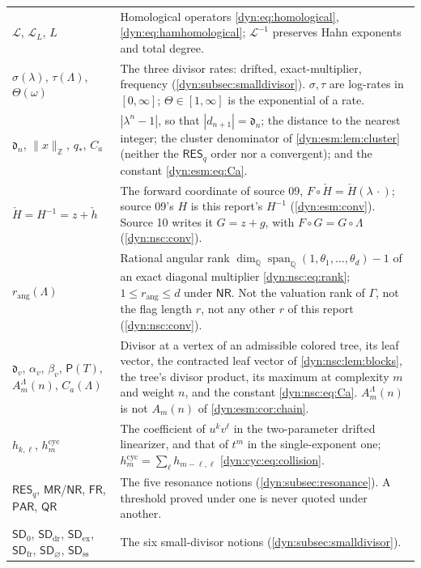 \documentclass[11pt,letterpaper]{article}
\theoremstyle{definition}
\theoremstyle{remark}
\newcommand{\Q}{\mathbb Q}
\newcommand{\Z}{\mathbb Z}
\newcommand{\Li}{\mathcal L}
\newcommand{\sdz}{\mathsf{SD}_{0}}
\newcommand{\sddr}{\mathsf{SD}_{\mathrm{dr}}}
\newcommand{\sdex}{\mathsf{SD}_{\mathrm{ex}}}
\newcommand{\sdfr}{\mathsf{SD}_{\mathrm{fr}}}
\newcommand{\sdno}{\mathsf{SD}_{\varnothing}}
\newcommand{\resq}{\mathsf{RES}_q}
\newcommand{\mres}{\mathsf{MR}}
\newcommand{\nres}{\mathsf{NR}}
\newcommand{\fres}{\mathsf{FR}}
\newcommand{\pares}{\mathsf{PAR}}
\newcommand{\qres}{\mathsf{QR}}
\newcommand{\sdss}{\mathsf{SD}_{\mathrm{ss}}}
\newcommand{\rang}{r_{\mathrm{ang}}}
\numberwithin{equation}{section}
\begin{document}
\begin{longtable}{@{}P{0.22\textwidth}P{0.71\textwidth}@{}}
$\Li$, $\Li_L$, $L$ & Homological operators
\eqref{dyn:eq:homological}, \eqref{dyn:eq:hamhomological}; $\Li^{-1}$
preserves Hahn exponents and total degree.\\[3pt]
$\sigma(\lambda)$, $\tau(\Lambda)$, $\Theta(\omega)$ & The three divisor
rates: drifted, exact-multiplier, frequency
(\cref{dyn:subsec:smalldivisor}). $\sigma,\tau$ are log-rates in
$[0,\infty]$; $\Theta\in[1,\infty]$ is the exponential of a rate.\\[3pt]
$\mathfrak d_n$, $\|x\|_{\Z}$, $q_*$, $C_a$ & $|\lambda^{n}-1|$, so that
$|d_{n+1}|=\mathfrak d_n$; the distance to the nearest integer; the cluster
denominator of \cref{dyn:esm:lem:cluster} (neither the $\resq$ order nor a
convergent); and the constant \eqref{dyn:esm:eq:Ca}.\\[3pt]
$\check H=H^{-1}=z+\check h$ & The forward coordinate of source 09,
$F\circ\check H=\check H(\lambda\,\cdot)$; source 09's $H$ is this report's
$H^{-1}$ (\cref{dyn:esm:conv}). Source 10 writes it $G=z+g$, with
$F\circ G=G\circ\Lambda$ (\cref{dyn:nsc:conv}).\\[3pt]
$\rang(\Lambda)$ & Rational angular rank
$\dim_{\Q}\operatorname{span}_{\Q}(1,\theta_1,\dots,\theta_d)-1$ of an exact
diagonal multiplier \eqref{dyn:nsc:eq:rank}; $1\le\rang\le d$ under $\nres$.
Not the valuation rank of $\Gamma$, not the flag length $r$, not any other
$r$ of this report (\cref{dyn:nsc:conv}).\\[3pt]
$\mathfrak d_v$, $\alpha_v$, $\beta_v$, $\mathsf P(T)$, $A^{\Lambda}_m(n)$,
$C_a(\Lambda)$ & Divisor at a vertex of an admissible colored tree, its
leaf vector, the contracted leaf vector of \cref{dyn:nsc:lem:blocks}, the
tree's divisor product, its maximum at complexity $m$ and weight $n$, and the
constant \eqref{dyn:nsc:eq:Ca}. $A^{\Lambda}_m(n)$ is not $A_m(n)$ of
\cref{dyn:esm:cor:chain}.\\[3pt]
$h_{k,\ell}$, $h^{\mathrm{cyc}}_m$ & The coefficient of $u^{k}v^{\ell}$ in
the two-parameter drifted linearizer, and that of $t^{m}$ in the
single-exponent one; $h^{\mathrm{cyc}}_m=\sum_{\ell}h_{m-\ell,\ell}$
\eqref{dyn:cyc:eq:collision}.\\[3pt]
$\resq$, $\mres$/$\nres$, $\fres$, $\pares$, $\qres$ & The five resonance
notions (\cref{dyn:subsec:resonance}). A threshold proved under one is
never quoted under another.\\[3pt]
$\sdz$, $\sddr$, $\sdex$, $\sdfr$, $\sdno$, $\sdss$ & The six small-divisor
notions (\cref{dyn:subsec:smalldivisor}).\\[3pt]

\end{longtable}
\end{document}
